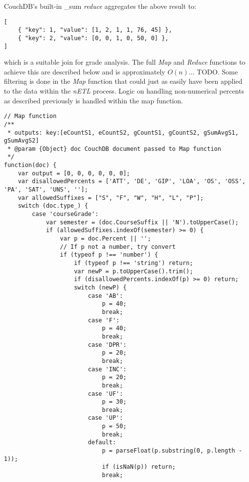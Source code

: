 CouchDB's built-in \_sum \textit{reduce} aggregates the above result to:

\begin{verbatim}
[
    { "key": 1, "value": [1, 2, 1, 1, 76, 45] },
    { "key": 2, "value": [0, 0, 1, 0, 50, 0] },
]
\end{verbatim}

which is a suitable join for grade analysis. The full \textit{Map} and \textit{Reduce} functions to achieve this are described below and is approximately $ O(n) $... TODO. Some filtering is done in the \textit{Map} function that could just as easily have been applied to the data within the \textit{nETL} process. Logic on handling non-numerical percents as described previously is handled within the map function.

\begin{verbatim}
// Map function
/**
 * outputs: key:[eCountS1, eCountS2, gCountS1, gCountS2, gSumAvgS1, gSumAvgS2]
 * @param {Object} doc CouchDB document passed to Map function
 */
function(doc) {
    var output = [0, 0, 0, 0, 0, 0];
    var disallowedPercents = ['ATT', 'DE', 'GIP', 'LOA', 'OS', 'OSS', 'PA', 'SAT', 'UNS', ''];
    var allowedSuffixes = ["S", "F", "W", "H", "L", "P"];
    switch (doc.type_) {
        case 'courseGrade':
            var semester = (doc.CourseSuffix || 'N').toUpperCase();
            if (allowedSuffixes.indexOf(semester) >= 0) {
                var p = doc.Percent || '';
                // If p not a number, try convert
                if (typeof p !== 'number') {
                    if (typeof p !== 'string') return;
                    var newP = p.toUpperCase().trim();
                    if (disallowedPercents.indexOf(p) >= 0) return;
                    switch (newP) {
                        case 'AB':
                            p = 40;
                            break;
                        case 'F':
                            p = 40;
                            break;
                        case 'DPR':
                            p = 20;
                            break;
                        case 'INC':
                            p = 20;
                            break;
                        case 'UF':
                            p = 30;
                            break;
                        case 'UP':
                            p = 50;
                            break;
                        default:
                            p = parseFloat(p.substring(0, p.length - 1));
                            if (isNaN(p)) return;
                            break;

\end{verbatim}
